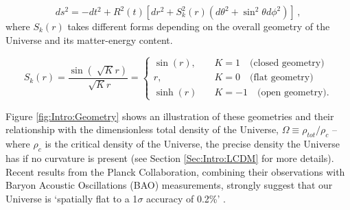 \begin{equation}
ds^2 = -dt^2 + R^2(t)\left[ dr^2 + S^2_k(r)\left(d\theta^2 + \sin^2\theta d\phi^2 \right) \right]\, ,
\label{Eq:Intro:FRW2}
\end{equation}
where $S_k(r)$ takes different forms depending on the overall geometry of the Universe and its matter-energy content. 

\begin{equation}
S_k(r) = \frac{\sin(\sqrt[]{K}r)}{\sqrt[]{K}r} = 
\begin{cases}
\sin (r), & \quad K = 1 \quad \text{(closed geometry)} \\
r, & \quad K = 0 \quad \text{(flat geometry)} \\
\sinh (r) & \quad K = -1 \quad \text{(open geometry)}.
\end{cases}
\label{Eq:Intro:Sk}
\end{equation}

\noindent Figure \ref{fig:Intro:Geometry} shows an illustration of these geometries and their relationship with the dimensionless total density of the Universe, $\Omega \equiv \rho_{tot}/\rho_c$ -- where $\rho_c$ is the critical density of the Universe, the precise density the Universe has if no curvature is present (see Section \ref{Sec:Intro:LCDM} for more details). Recent results from the Planck Collaboration, combining their observations with Baryon Acoustic Oscillations (BAO) measurements, strongly suggest that our Universe is `spatially flat to a 1$\sigma$ accuracy of 0.2\%' \citep{2018PlanckCosmology}.

